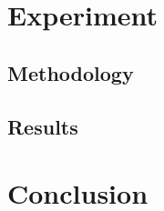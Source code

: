 \documentclass{article}
\begin{document}
\section{Experiment}
\label{sec:experiment}


	\subsection{Methodology}
	\label{ssec:methodology}




	\subsection{Results}
	\label{ssec:results}


\section{Conclusion}
\label{sec:conclusion}


\newpage


\end{document}
